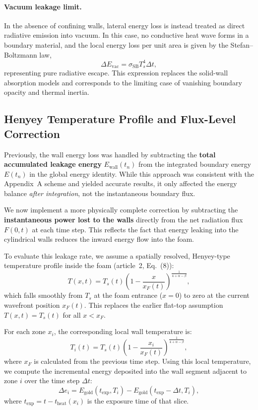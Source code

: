 \documentclass{article}
\begin{document}
\paragraph{Vacuum leakage limit.}
In the absence of confining walls, lateral energy loss is instead treated as direct radiative emission into vacuum. In this case, no conductive heat wave forms in a boundary material, and the local energy loss per unit area is given by the Stefan--Boltzmann law,
\begin{equation}
\Delta E_{\mathrm{vac}} = \sigma_{\mathrm{SB}} T_s^4 \Delta t,
\end{equation}
representing pure radiative escape. This expression replaces the solid-wall absorption models and corresponds to the limiting case of vanishing boundary opacity and thermal inertia.



\subsection*{Henyey Temperature Profile and Flux-Level Correction}
Previously, the wall energy loss was handled by subtracting the \textbf{total accumulated leakage energy} $E_{\text{wall}}(t_n)$ from the integrated boundary energy $E(t_n)$ in the global energy identity. While this approach was consistent with the Appendix~A scheme and yielded accurate results, it only affected the energy balance \emph{after integration}, not the instantaneous boundary flux.

We now implement a more physically complete correction by subtracting the \textbf{instantaneous power lost to the walls} directly from the net radiation flux $F(0,t)$ at each time step. This reflects the fact that energy leaking into the cylindrical walls reduces the inward energy flow into the foam.

To evaluate this leakage rate, we assume a spatially resolved, Henyey-type temperature profile inside the foam (article~2, Eq.~(8)):
\begin{equation}
T(x,t) = T_s(t) \left(1 - \frac{x}{x_F(t)} \right)^{\frac{1}{4 + \alpha - \beta}},
\end{equation}
which falls smoothly from $T_s$ at the foam entrance ($x=0$) to zero at the current wavefront position $x_F(t)$. This replaces the earlier flat-top assumption $T(x,t) = T_s(t)$ for all $x < x_F$.

For each zone $x_i$, the corresponding local wall temperature is:
\begin{equation}
T_i(t) = T_s(t) \left(1 - \frac{x_i}{x_F(t)} \right)^{\frac{1}{4 + \alpha - \beta}},
\end{equation}
where $x_F$ is calculated from the previous time step. Using this local temperature, we compute the incremental energy deposited into the wall segment adjacent to zone $i$ over the time step $\Delta t$:
\begin{equation}
\Delta e_i = E_{\mathrm{gold}}(t_{\mathrm{exp}}, T_i) - E_{\mathrm{gold}}(t_{\mathrm{exp}} - \Delta t, T_i),
\end{equation}
where $t_{\mathrm{exp}} = t - t_{\text{heat}}(x_i)$ is the exposure time of that slice.
\end{document}
